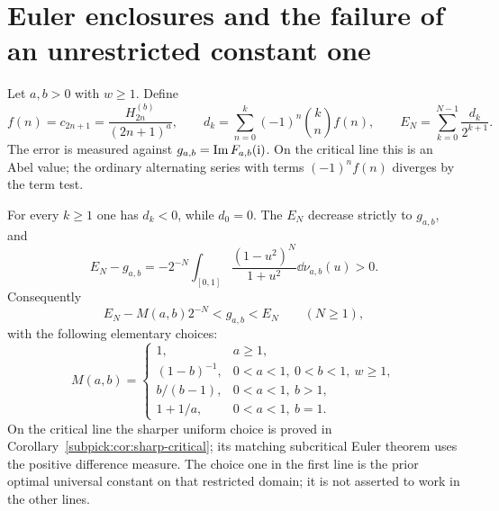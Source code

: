 \section{Euler enclosures and the failure of an unrestricted constant one}
\label{rw:sec:euler}

Let $a,b>0$ with $w\ge1$. Define
\begin{equation}\label{rw:eq:eulerdef}
 f(n)=c_{2n+1}=\frac{H_{2n}^{(b)}}{(2n+1)^a},\qquad
 d_k=\sum_{n=0}^k(-1)^n\binom kn f(n),\qquad
 E_N=\sum_{k=0}^{N-1}\frac{d_k}{2^{k+1}}.
\end{equation}
The error is measured against $g_{a,b}=\operatorname{Im} F_{a,b}(\mathrm{i})$.
On the critical line this is an Abel value; the ordinary alternating
series with terms $(-1)^nf(n)$ diverges by the term test.

\begin{theorem}\label{rw:thm:euler}
For every $k\ge1$ one has $d_k<0$, while $d_0=0$. The $E_N$ decrease
strictly to $g_{a,b}$, and
\begin{equation}\label{rw:eq:exacteuler}
 E_N-g_{a,b}=-2^{-N}\int_{[0,1]}
       \frac{(1-u^2)^N}{1+u^2}\dd\nu_{a,b}(u)>0.
\end{equation}
Consequently
\begin{equation}\label{rw:eq:eulerenclosure}
 E_N-M(a,b)2^{-N}<g_{a,b}<E_N\qquad(N\ge1),
\end{equation}
with the following elementary choices:
\begin{equation}\label{rw:eq:Mchoices}
 M(a,b)=
 \begin{cases}
 1,&a\ge1,\\
 (1-b)^{-1},&0<a<1,\ 0<b<1,\ w\ge1,\\
 b/(b-1),&0<a<1,\ b>1,\\
 1+1/a,&0<a<1,\ b=1.
 \end{cases}
\end{equation}
On the critical line the sharper uniform choice is proved in
Corollary~\ref{subpick:cor:sharp-critical}; its matching subcritical
Euler theorem uses the positive difference measure.
The choice one in the first line is the prior optimal universal
constant on that restricted domain; it is not asserted to work in
the other lines.
\end{theorem}
